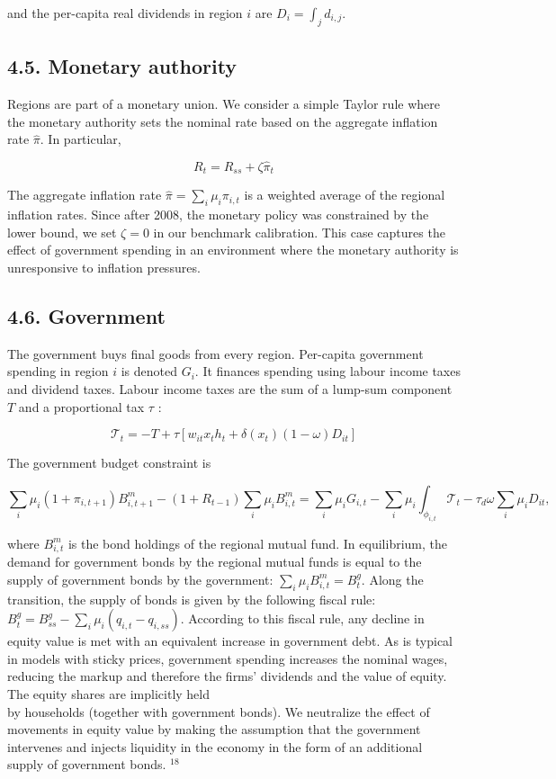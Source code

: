 \documentclass[10pt]{article}
\begin{document}
and the per-capita real dividends in region $i$ are $D_{i}=\int_{j} d_{i, j}$.

\subsection*{4.5. Monetary authority}
Regions are part of a monetary union. We consider a simple Taylor rule where the monetary authority sets the nominal rate based on the aggregate inflation rate $\hat{\pi}$. In particular,


\begin{equation*}
R_{t}=R_{s s}+\zeta \hat{\pi}_{t} \tag{4.21}
\end{equation*}


The aggregate inflation rate $\hat{\pi}=\sum_{i} \mu_{i} \pi_{i, t}$ is a weighted average of the regional inflation rates. Since after 2008, the monetary policy was constrained by the lower bound, we set $\zeta=0$ in our benchmark calibration. This case captures the effect of government spending in an environment where the monetary authority is unresponsive to inflation pressures.

\subsection*{4.6. Government}
The government buys final goods from every region. Per-capita government spending in region $i$ is denoted $G_{i}$. It finances spending using labour income taxes and dividend taxes. Labour income taxes are the sum of a lump-sum component $T$ and a proportional tax $\tau$ :

$$
\mathcal{T}_{t}=-T+\tau\left[w_{i t} x_{t} h_{t}+\delta\left(x_{t}\right)(1-\omega) D_{i t}\right]
$$

The government budget constraint is


\begin{equation*}
\sum_{i} \mu_{i}\left(1+\pi_{i, t+1}\right) B_{i, t+1}^{m}-\left(1+R_{t-1}\right) \sum_{i} \mu_{i} B_{i, t}^{m}=\sum_{i} \mu_{i} G_{i, t}-\sum_{i} \mu_{i} \int_{\phi_{i, t}} \mathcal{T}_{t}-\tau_{d} \omega \sum_{i} \mu_{i} D_{i t}, \tag{4.22}
\end{equation*}


where $B_{i, t}^{m}$ is the bond holdings of the regional mutual fund. In equilibrium, the demand for government bonds by the regional mutual funds is equal to the supply of government bonds by the government: $\sum_{i} \mu_{i} B_{i, t}^{m}=B_{t}^{g}$. Along the transition, the supply of bonds is given by the following fiscal rule: $B_{t}^{g}=B_{s s}^{g}-\sum_{i} \mu_{i}\left(q_{i, t}-q_{i, s s}\right)$. According to this fiscal rule, any decline in equity value is met with an equivalent increase in government debt. As is typical in models with sticky prices, government spending increases the nominal wages, reducing the markup and therefore the firms' dividends and the value of equity. The equity shares are implicitly held\\
by households (together with government bonds). We neutralize the effect of movements in equity value by making the assumption that the government intervenes and injects liquidity in the economy in the form of an additional supply of government bonds. ${ }^{18}$
\end{document}

